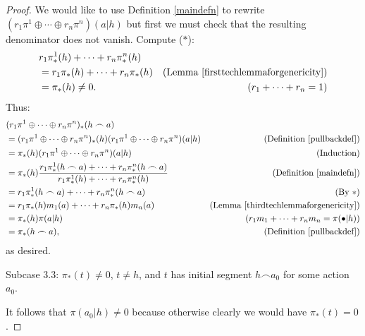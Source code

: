 \documentclass[runningheads]{llncs}
\begin{document}
\begin{proof}
    We would like to use Definition \ref{maindefn} to rewrite
    $(r_1\pi^1\oplus\cdots\oplus r_n\pi^n)(a|h)$ but first we must check
    that the resulting denominator does not vanish.
    Compute ($*$):
    \begin{align*}
        &{} r_1\pi^1_*(h)+\cdots+r_n\pi^n_*(h)\\
            &= r_1\pi_*(h)+\cdots+r_n\pi_*(h)
                &\mbox{(Lemma \ref{firsttechlemmaforgenericity})}\\
            &= \pi_*(h)\not=0.
                &\mbox{($r_1+\cdots+r_n=1$)}
    \end{align*}
    Thus:
    \begin{align*}
        &{} (r_1\pi^1\oplus\cdots\oplus r_n\pi^n)_*(h\frown a)\\
            &= (r_1\pi^1\oplus\cdots\oplus r_n\pi^n)_*(h)
                (r_1\pi^1\oplus\cdots\oplus r_n\pi^n)(a|h)
                    &\mbox{(Definition \ref{pullbackdef})}\\
            &= \pi_*(h)(r_1\pi^1\oplus\cdots\oplus r_n\pi^n)(a|h)
                    &\mbox{(Induction)}\\
            &= \pi_*(h)
                \frac
                {r_1\pi^1_*(h\frown a)+\cdots+r_n\pi^n_*(h\frown a)}
                {r_1\pi^1_*(h)+\cdots+r_n\pi^n_*(h)}
                    &\mbox{(Definition \ref{maindefn})}\\
            &= r_1\pi^1_*(h\frown a)+\cdots+r_n\pi^n_*(h\frown a)
                    &\mbox{(By $*$)}\\
            &= r_1\pi_*(h)m_1(a)+\cdots+r_n\pi_*(h)m_n(a)
                    &\mbox{(Lemma \ref{thirdtechlemmaforgenericity})}\\
            &= \pi_*(h)\pi(a|h)
                    &\mbox{($r_1m_1+\cdots+r_nm_n=\pi(\bullet|h)$)}\\
            &= \pi_*(h\frown a),
                    &\mbox{(Definition \ref{pullbackdef})}
    \end{align*}
    as desired.

    Subcase 3.3: $\pi_*(t)\not=0$, $t\not=h$, and
    $t$ has initial segment $h\frown a_0$ for some action $a_0$.

    It follows that $\pi(a_0|h)\not=0$ because otherwise clearly
    we would have $\pi_*(t)=0$.


\end{proof}
\end{document}
